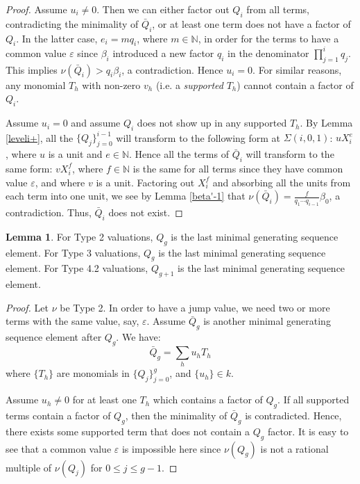 \documentclass[11pt]{amsart}
\theoremstyle{definition}
\newtheorem{lem}[thm]{Lemma}
\begin{document}
{\begin{proof}
Assume $u_i\neq 0$. Then we can either factor out $Q_i$ from all terms, contradicting the minimality of $\bar Q_i$, or at least one term does not have a factor of $Q_i$. In the latter case, $e_i=mq_i$, where $m\in\mathbb{N}$, in order for the terms to have a common value $\varepsilon$ since $\beta_i$ introduced a new factor $q_i$ in the denominator $\prod_{j=1}^{i}q_j$. This implies $\nu(\bar Q_i) > q_i\beta_i$, a contradiction. Hence $u_i=0$. For similar reasons, any monomial $T_h$ with non-zero $v_h$ (i.e. a {\it supported} $T_h$) cannot contain a factor of $Q_i$.

Assume $u_i=0$ and assume $Q_i$ does not show up in any supported $T_h$. By Lemma \ref{leveli+}, all the $\{Q_j\}_{j=0}^{i-1}$ will transform to the following form at $\Sigma(i,0,1)$: $uX_i^e$, where $u$ is a unit and $e\in\mathbb{N}$. Hence all the terms of $\bar Q_i$ will transform to the same form: $vX_i^f$, where $f\in\mathbb{N}$ is the same for all terms since they have common value $\varepsilon$, and where $v$ is a unit. Factoring out $X_i^f$ and absorbing all the units from each term into one unit, we see by Lemma \ref{beta'-1} that $\displaystyle \nu(\bar Q_i)=\frac{f}{q_1\cdots q_{i-1}}\beta_0$, a contradiction. Thus, $\bar Q_i$ does not exist.
\end{proof}

\begin{lem} \label{nonredundant234}
For Type 2 valuations, $Q_g$ is the last minimal generating sequence element. For Type 3 valuations, $Q_g$ is the last minimal generating sequence element. For Type 4.2 valuations, $Q_{g+1}$ is the last minimal generating sequence element.
\end{lem}
\begin{proof}
Let $\nu$ be Type 2. In order to have a jump value, we need two or more terms with the same value, say, $\varepsilon$. Assume $\bar Q_g$ is another minimal generating sequence element after $Q_g$. We have:
 \begin{equation*}
\bar Q_g=\sum_h u_hT_h
\end{equation*}
where $\{T_h\}$ are monomials in $\{Q_j\}_{j=0}^{g}$, and $\{u_h\}\in k$.

Assume $u_h\neq 0$ for at least one $T_h$ which contains a factor of $Q_g$. If all supported terms contain a factor of $Q_g$, then the minimality of $\bar Q_g$ is contradicted. Hence, there exists some supported term that does not contain a $Q_g$ factor. It is easy to see that a common value $\varepsilon$ is impossible here since $\nu(Q_g)$ is not a rational multiple of $\nu(Q_j)$ for $0\leq j \leq g-1$.


\end{proof}}
\end{document}
